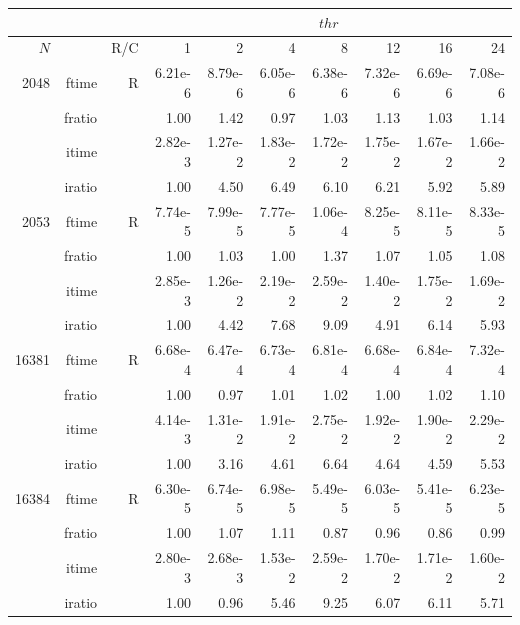 \documentclass[a4paper]{article}
\begin{document}
\begin{table}
\begin{center}
\begin{tabular}{|r|r|r|r|r|r|r|r|r|r|}
\hline 
     \multicolumn{3}{|c|}{ } & \multicolumn{7}{c|}{$thr$} \\ \hline
    $N$  & & R/C  & 1           & 2    & 4    & 8    & 12   & 16    & 24  \\ \hline\hline
    2048  & ftime & R  &  6.21e-6 &   8.79e-6 &   6.05e-6 &   6.38e-6 &   7.32e-6 &   6.69e-6 &   7.08e-6  \\ 
      & fratio & & 1.00 &   1.42 &   0.97 &   1.03 &   1.13 &   1.03 &   1.14   \\ 
     & itime & &    2.82e-3 &   1.27e-2 &   1.83e-2 &   1.72e-2 &   1.75e-2 &   1.67e-2 &   1.66e-2   \\ 
     & iratio & &   1.00 &   4.50 &   6.49 &   6.10 &   6.21 &   5.92 &   5.89    \\ \hline 
    2053  & ftime & R &  7.74e-5 & 7.99e-5 &   7.77e-5 &   1.06e-4 &   8.25e-5 &   8.11e-5 &   8.33e-5    \\ 
      & fratio & &  1.00 &   1.03 &   1.00 &   1.37 &   1.07 &   1.05 &   1.08   \\ 
     & itime &  &   2.85e-3 &   1.26e-2 &   2.19e-2 &   2.59e-2 &   1.40e-2 &   1.75e-2 &   1.69e-2    \\ 
    & iratio &  &     1.00 &   4.42 &   7.68 &   9.09 &   4.91 &   6.14 &   5.93     \\ \hline 
  16381  & ftime & R &  6.68e-4 &   6.47e-4 &   6.73e-4 &   6.81e-4 &   6.68e-4 &   6.84e-4 &   7.32e-4      \\ 
      & fratio & &  1.00 &   0.97 &   1.01 &   1.02 &   1.00 &   1.02 &   1.10    \\ 
     & itime & &   4.14e-3 &   1.31e-2 &   1.91e-2 &   2.75e-2 &   1.92e-2 &   1.90e-2 &   2.29e-2    \\ 
     & iratio & &  1.00 &   3.16 &   4.61 &   6.64 &   4.64 &   4.59 &   5.53     \\ \hline 
 16384  & ftime & R &  6.30e-5 &   6.74e-5 &   6.98e-5 &   5.49e-5 &   6.03e-5 &   5.41e-5 &   6.23e-5   \\ 
      & fratio & &   1.00 &   1.07 &   1.11 &   0.87 &  0.96 &   0.86 &   0.99 \\
     & itime & &  2.80e-3 &   2.68e-3 &   1.53e-2 &   2.59e-2 &   1.70e-2 &   1.71e-2 &   1.60e-2   \\ 
 & iratio & &  1.00 &   0.96 &   5.46 &   9.25 &   6.07 &   6.11 &   5.71   \\  \hline 

\end{tabular}
\end{center}
\end{table}
\end{document}
